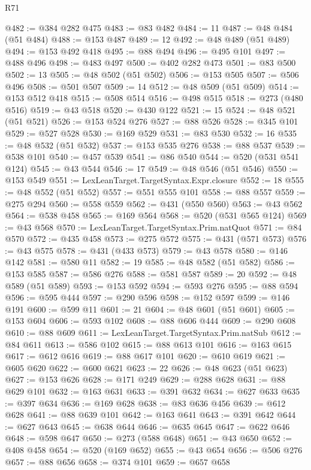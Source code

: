 \begin{lexlean}{R71}
\begin{coremodule}
@482 := @384 @282 @475
@483 := @83 @482
@484 := 11
@487 := @48 @484 (@51 @484)
@488 := @153 @487
@489 := 12
@492 := @48 @489 (@51 @489)
@494 := @153 @492 @418
@495 := @88 @494
@496 := @495 @101
@497 := @488 @496
@498 := @483 @497
@500 := @402 @282 @473
@501 := @83 @500
@502 := 13
@505 := @48 @502 (@51 @502)
@506 := @153 @505
@507 := @506 @496
@508 := @501 @507
@509 := 14
@512 := @48 @509 (@51 @509)
@514 := @153 @512 @418
@515 := @508 @514
@516 := @498 @515
@518 := @273 (@480 @516)
@519 := @43 @518
@520 := @430 @122
@521 := 15
@524 := @48 @521 (@51 @521)
@526 := @153 @524 @276
@527 := @88 @526
@528 := @345 @101
@529 := @527 @528
@530 := @169 @529
@531 := @83 @530
@532 := 16
@535 := @48 @532 (@51 @532)
@537 := @153 @535 @276
@538 := @88 @537
@539 := @538 @101
@540 := @457 @539
@541 := @86 @540
@544 := @520 (@531 @541 @124)
@545 := @43 @544
@546 := 17
@549 := @48 @546 (@51 @546)
@550 := @153 @549
@551 := LexLeanTarget.TargetSyntax.Expr.closure
@552 := 18
@555 := @48 @552 (@51 @552)
@557 := @551 @555 @101
@558 := @88 @557
@559 := @275 @294
@560 := @558 @559
@562 := @431 (@550 @560)
@563 := @43 @562
@564 := @538 @458
@565 := @169 @564
@568 := @520 (@531 @565 @124)
@569 := @43 @568
@570 := LexLeanTarget.TargetSyntax.Prim.natQuot
@571 := @84 @570
@572 := @435 @458
@573 := @275 @572
@575 := @431 (@571 @573)
@576 := @43 @575
@578 := @431 (@433 @573)
@579 := @43 @578
@580 := @146 @142
@581 := @580 @11
@582 := 19
@585 := @48 @582 (@51 @582)
@586 := @153 @585
@587 := @586 @276
@588 := @581 @587
@589 := 20
@592 := @48 @589 (@51 @589)
@593 := @153 @592
@594 := @593 @276
@595 := @88 @594
@596 := @595 @444
@597 := @290 @596
@598 := @152 @597
@599 := @146 @191
@600 := @599 @11
@601 := 21
@604 := @48 @601 (@51 @601)
@605 := @153 @604
@606 := @593 @102
@608 := @88 @606 @444
@609 := @290 @608
@610 := @88 @609
@611 := LexLeanTarget.TargetSyntax.Prim.natSub
@612 := @84 @611
@613 := @586 @102
@615 := @88 @613 @101
@616 := @163 @615
@617 := @612 @616
@619 := @88 @617 @101
@620 := @610 @619
@621 := @605 @620
@622 := @600 @621
@623 := 22
@626 := @48 @623 (@51 @623)
@627 := @153 @626
@628 := @171 @249
@629 := @288 @628
@631 := @88 @629 @101
@632 := @163 @631
@633 := @391 @632
@634 := @627 @633
@635 := @397 @634
@636 := @169 @628
@638 := @83 @636 @456
@639 := @612 @628
@641 := @88 @639 @101
@642 := @163 @641
@643 := @391 @642
@644 := @627 @643
@645 := @638 @644
@646 := @635 @645
@647 := @622 @646
@648 := @598 @647
@650 := @273 (@588 @648)
@651 := @43 @650
@652 := @408 @458
@654 := @520 (@169 @652)
@655 := @43 @654
@656 := @506 @276
@657 := @88 @656
@658 := @374 @101
@659 := @657 @658

\end{coremodule}
\end{lexlean}
